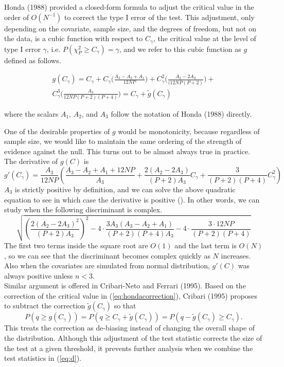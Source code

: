 \documentclass[aap,authoryear, preprint]{imsart}
\numberwithin{equation}{section}
\theoremstyle{plain}
\begin{document}
Honda (1988) provided a closed-form formula to adjust the critical value in the order of $O(N^{-1})$ to correct the type I error of the test. This adjustment, only depending on the covariate, sample size, and the degrees of freedom, but not on the data, is a cubic function with respect to $C_{\gamma}$, the critical value at the level of type I error $\gamma$, i.e. $P(\chi_{P}^2 \geq C_{\gamma}) = \gamma$, and we refer to this cubic function as $g$ defined as follows.

\begin{equation}
    \begin{multlined}
g(C_{\gamma}) = C_{\gamma} + C_{\gamma}\bigg(\frac{A_3 - A_2 + A_1}{12NP}\bigg) + C_{\gamma}^2\bigg(\frac{A_2 - 2A_3}{(12NP(P+2)}\bigg) +\\
C_{\gamma}^3 \bigg(\frac{A_3}{12NP(P+2)(P+4)}\bigg) = C_{\gamma} + \tilde{g}(C_{\gamma})
\end{multlined}
\label{eq:hondacorrection}
\end{equation}

where the scalars $A_1$, $A_2$, and $A_3$ follow the notation of Honda (1988) directly. 

\vspace{5mm}  
One of the desirable properties of $g$ would be monotonicity, because regardless of sample size, we would like to maintain the same ordering of the strength of evidence against the null. This turns out to be almost always true in practice. The derivative of $g(C)$ is 
$$g'(C_{\gamma}) = \frac{A_3}{12NP}\left( \frac{A_3-A_2+A_1+12NP}{A_3} + 
 \frac{2(A_2-2A_3)}{(P+2)A_3}C_{\gamma} + \frac{3}{(P+2)(P+4)}C_{\gamma}^2 \right)$$
$A_3$ is strictly positive by definition, and we can solve the above quadratic equation to see in which case the derivative is positive (\cite{cribari1995improved}). In other words, we can study when the following discriminant is complex.
$$\sqrt{\left(\frac{2(A_2-2A_3)^2}{(P+2)A_3}\right)^2 - 4\cdot\frac{3A_3(A_3-A_2+A_1)}{(P+2)(P+4)A_3} - 4\cdot
\frac{3 \cdot 12NP}{(P+2)(P+4)}}$$
The first two terms inside the square root are $O(1)$ and the last term is $O(N)$, so we can see that the discriminant becomes complex quickly as $N$ increases. Also when the covariates are simulated from normal distribution, $g'(C)$ was always positive unless $n<3$. \\


Similar argument is offered in Cribari-Neto and Ferrari (1995). Based on the correction of the critical value in (\ref{eq:hondacorrection}), Cribari (1995) proposes to subtract the correction $\tilde{g}(C_{\gamma})$ so that
$$P(q  \geq g(C_{\gamma})) = P(q \geq C_{\gamma} + \tilde{g}(C_{\gamma})) = P(q - \tilde{g}(C_{\gamma}) \geq C_{\gamma}).$$
This treats the correction as de-biasing instead of changing the overall shape of the distribution. Although this adjustment of the test statistic corrects the size of the test at a given threshold, it prevents further analysis when we combine the test statistics in (\ref{eq:d}). 
\end{document}

